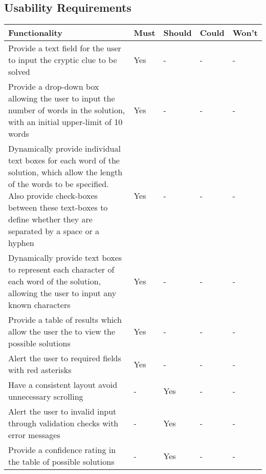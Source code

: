 \subsection{Usability Requirements}

\begin{table}[H]
  \centering
  \small
    \begin{tabular}{|p{9.3cm}|p{1.3cm}|p{1.3cm}|p{1.3cm}|p{1.3cm}|}
    \hline
    \textbf{Functionality} & \textbf{Must} & \textbf{Should} & \textbf{Could} & \textbf{Won't} \\ \hline

    Provide a text field for the user to input the cryptic clue to be solved &
    Yes & - & - & - \\ \hline

    Provide a drop-down box allowing the user to input the number of words in 
    the solution, with an initial upper-limit of 10 words &
    Yes & - & - & - \\ \hline

    Dynamically provide individual text boxes for each word of the solution, 
    which allow the length of the words to be specified. Also provide 
    check-boxes between these text-boxes to define whether they are separated by
     a space or a hyphen &
    Yes & - & - & - \\ \hline

    Dynamically provide text boxes to represent each character of each word of 
    the solution, allowing the user to input any known characters &
    Yes & - & - & - \\ \hline

    Provide a table of results which allow the user the to view the possible 
    solutions &
    Yes & - & - & - \\ \hline

    Alert the user to required fields with red asterisks &
    Yes & - & - & - \\ \hline

    Have a consistent layout avoid unnecessary scrolling &
    - & Yes & - & - \\ \hline

    Alert the user to invalid input through validation checks with error 
    messages &
    - & Yes & - & - \\ \hline

    Provide a confidence rating in the table of possible solutions &
    - & Yes & - & - \\ \hline


\end{tabular}
\end{table}
